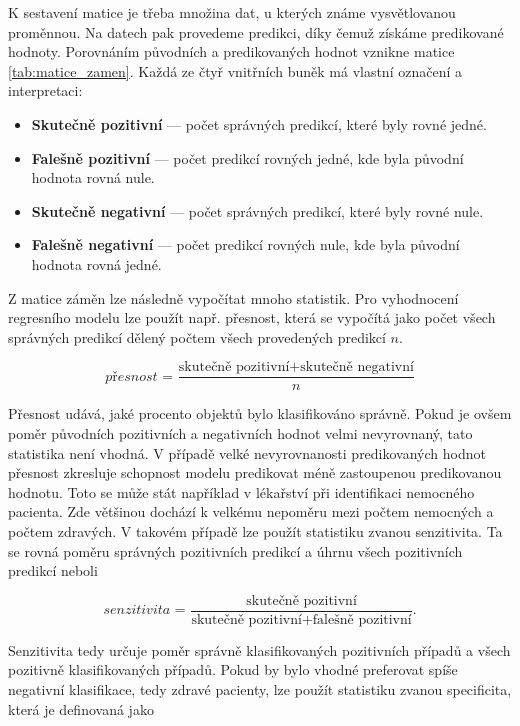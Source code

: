 K sestavení matice je třeba množina dat, u kterých známe vysvětlovanou proměnnou. Na datech pak provedeme predikci, díky čemuž získáme predikované hodnoty. Porovnáním
původních a predikovaných hodnot vznikne matice \ref{tab:matice_zamen}. Každá ze čtyř vnitřních buněk má vlastní označení a interpretaci:

\begin{itemize}
    \item \textbf{Skutečně pozitivní} --- počet správných predikcí, které byly rovné jedné.
    \item \textbf{Falešně pozitivní} --- počet predikcí rovných jedné, kde byla původní hodnota rovná nule.
    \item \textbf{Skutečně negativní} --- počet správných predikcí, které byly rovné nule.
    \item \textbf{Falešně negativní} --- počet predikcí rovných nule, kde byla původní hodnota rovná jedné.
\end{itemize}

Z matice záměn lze následně vypočítat mnoho statistik. Pro vyhodnocení regresního modelu lze použít např. přesnost, která se vypočítá jako počet všech správných predikcí
dělený počtem všech provedených predikcí $n$.

\begin{equation}
    \textit{přesnost = } \frac{\text{skutečně pozitivní} + \text{skutečně negativní}}{n}
\end{equation}

Přesnost udává, jaké procento objektů bylo klasifikováno správně. Pokud je ovšem poměr původních pozitivních a negativních hodnot velmi nevyrovnaný,
tato statistika není vhodná. V případě velké nevyrovnanosti predikovaných hodnot přesnost zkresluje schopnost modelu predikovat méně zastoupenou predikovanou hodnotu. 
Toto se může stát například v lékařství při identifikaci nemocného pacienta. Zde většinou dochází k velkému nepoměru mezi počtem nemocných a počtem zdravých.
V takovém případě lze použít statistiku zvanou senzitivita. Ta se rovná poměru správných pozitivních predikcí a úhrnu všech pozitivních predikcí neboli

\begin{equation}
    \textit{senzitivita = } \frac{\text{skutečně pozitivní}}{\text{skutečně pozitivní} + \text{falešně pozitivní}}.
\end{equation}

Senzitivita tedy určuje poměr správně klasifikovaných pozitivních případů a všech pozitivně klasifikovaných případů. Pokud by bylo vhodné preferovat
spíše negativní klasifikace, tedy zdravé pacienty, lze použít statistiku zvanou specificita, která je definovaná jako

